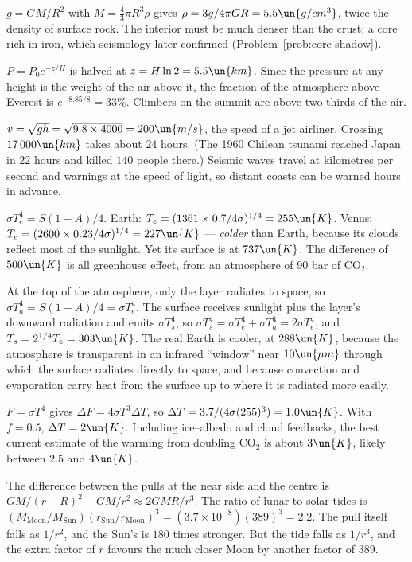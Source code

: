 
 $g = GM/R^2$ with $M = \tfrac43\pi R^3\rho$ gives $\rho = 3g/4\pi GR = 5.5\un{g/cm^3}$, twice the density of surface rock. The interior must be much denser than the crust: a core rich in iron, which seismology later confirmed (Problem~\ref{prob:core-shadow}).

 $P = P_0e^{-z/H}$ is halved at $z = H\ln2 = 5.5\un{km}$. Since the pressure at any height is the weight of the air above it, the fraction of the atmosphere above Everest is $e^{-8.85/8} = 33\%$. Climbers on the summit are above two-thirds of the air.

 $v = \sqrt{gh} = \sqrt{9.8\times4000} = 200\un{m/s}$, the speed of a jet airliner. Crossing $17\,000\un{km}$ takes about $24$ hours. (The 1960 Chilean tsunami reached Japan in $22$ hours and killed $140$ people there.) Seismic waves travel at kilometres per second and warnings at the speed of light, so distant coasts can be warned hours in advance.

 $\sigma T_e^4 = S(1-A)/4$. Earth: $T_e = (1361\times0.7/4\sigma)^{1/4} = 255\un{K}$. Venus: $T_e = (2600\times0.23/4\sigma)^{1/4} = 227\un{K}$ --- \emph{colder} than Earth, because its clouds reflect most of the sunlight. Yet its surface is at $737\un{K}$. The difference of $500\un{K}$ is all greenhouse effect, from an atmosphere of $90$ bar of CO$_2$.

 At the top of the atmosphere, only the layer radiates to space, so $\sigma T_a^4 = S(1-A)/4 = \sigma T_e^4$. The surface receives sunlight plus the layer's downward radiation and emits $\sigma T_s^4$, so $\sigma T_s^4 = \sigma T_e^4 + \sigma T_a^4 = 2\sigma T_e^4$, and $T_s = 2^{1/4}T_e = 303\un{K}$. The real Earth is cooler, at $288\un{K}$, because the atmosphere is transparent in an infrared ``window'' near $10\un{\mu m}$ through which the surface radiates directly to space, and because convection and evaporation carry heat from the surface up to where it is radiated more easily.

 $F = \sigma T^4$ gives $\Delta F = 4\sigma T^3\Delta T$, so $\Delta T = 3.7/(4\sigma(255)^3) = 1.0\un{K}$. With $f = 0.5$, $\Delta T = 2\un{K}$. Including ice--albedo and cloud feedbacks, the best current estimate of the warming from doubling CO$_2$ is about $3\un{K}$, likely between $2.5$ and $4\un{K}$.

 The difference between the pulls at the near side and the centre is $GM/(r-R)^2 - GM/r^2\approx2GMR/r^3$. The ratio of lunar to solar tides is $(M_{\text{Moon}}/M_{\text{Sun}})(r_{\text{Sun}}/r_{\text{Moon}})^3 = (3.7\times10^{-8})(389)^3 = 2.2$. The pull itself falls as $1/r^2$, and the Sun's is $180$ times stronger. But the tide falls as $1/r^3$, and the extra factor of $r$ favours the much closer Moon by another factor of $389$.

